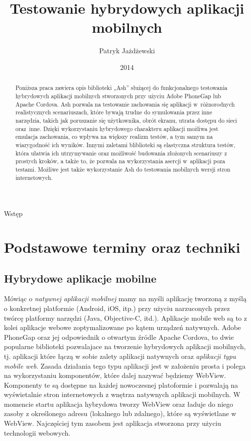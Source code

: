 \documentclass[brudnopis]{xmgr}
\author   {Patryk Jażdżewski}
\title    {Testowanie hybrydowych aplikacji mobilnych}
\date     {2014}
\begin{document}
\begin{abstract}
  Poniższa praca zawiera opis biblioteki „Ash” służącej do funkcjonalnego testowania
hybrydowych aplikacji mobilnych stworzonych przy użyciu Adobe PhoneGap lub
Apache Cordova. Ash pozwala na testowanie zachowania się aplikacji w~różnorodnych
realistycznych scenariuszach, które bywają trudne do symulowania przez inne narzędzia, takich jak poruszanie się użytkownika,
obrót ekranu, utrata dostępu do sieci oraz~inne. Dzięki wykorzystaniu hybrydowego charakteru aplikacji
możliwa jest emulacja zachowania, co wpływa na większy realizm testów, a tym samym na wiarygodność ich wyników. Innymi
zaletami bliblioteki są elastyczna struktura testów, która ułatwia ich utrzymywanie oraz możliwość budowania złożonych scenariuszy z prostych kroków, a także
to, że pozwala na wykorzystania asercji w~aplikacji poza testami.
Możliwe jest także wykorzystanie Ash do testowania mobilnych wersji stron internetowych. 
\end{abstract}

\maketitle

\introduction

Wstęp

\chapter{Podstawowe terminy oraz techniki}
\section{Hybrydowe aplikacje mobilne}
Mówiąc o \textit{natywnej aplikacji mobilnej} mamy na myśli aplikację tworzoną z myślą o konkretnej platformie (Android, iOS, itp.) przy użyciu narzuconych przez twórcę platformy narzędzi (Java, Objective-C, itd.). Aplikacje mobile web są to z kolei aplikacje webowe zoptymalizowane po kątem urządzeń natywnych.
Adobe PhoneGap oraz jej odpowiednik o otwartym źródle Apache Cordova, to
dwie popularne biblioteki pozwalajace na tworzenie hybrydowych aplikacji
mobilnych, tj. aplikacji które łączą w sobie zalety aplikacji natywnych oraz \textit{aplikacji
typu mobile web}. Zasada działania tego typu aplikacji jest w założeniu prosta i
polega na wykorzystaniu komponentów, które dalej nazywać będziemy WebView.
Komponenty te są dostępne na każdej nowoczesnej platoformie i pozwalają na
wyświetalnie stron internetowych z wnętrza natywnych aplikacji mobilnych. 
W momencie startu aplikacja hybrydowa tworzy WebView oraz ładuje do niego zasoby z określonego adresu (lokalnego lub zdalnego), które są wyświetlane w WebView. Najczęściej tym zasobem jest aplikacja stworzona przy użyciu technologii webowych.     
\end{document}

